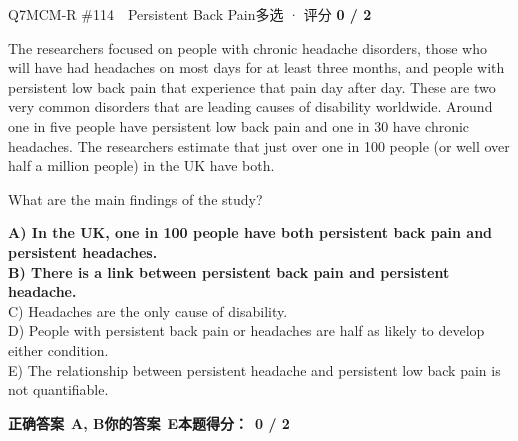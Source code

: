 \begin{qblock}{Q7\quad MCM-R \#114\ \ Persistent Back Pain}{多选 · 评分 \textcolor{cAccent}{\bfseries 0 / 2}}
\begin{promptbox}
The researchers focused on people with chronic headache disorders, those who will have had headaches on most days for at least three months, and people with persistent low back pain that experience that pain day after day. These are two very common disorders that are leading causes of disability worldwide. Around one in five people have persistent low back pain and one in 30 have chronic headaches. The researchers estimate that just over one in 100 people (or well over half a million people) in the UK have both.
\end{promptbox}
\begin{notebox}What are the main findings of the study?\end{notebox}
{\small
{\color{cFix}\textbf{A) In the UK, one in 100 people have both persistent back pain and persistent headaches.}}\\
{\color{cFix}\textbf{B) There is a link between persistent back pain and persistent headache.}}\\
C) Headaches are the only cause of disability.\\
D) People with persistent back pain or headaches are half as likely to develop either condition.\\
E) The relationship between persistent headache and persistent low back pain is not quantifiable.}
\par\smallskip
\textbf{正确答案}\ \textcolor{cFix}{\bfseries A, B}\qquad\textbf{你的答案}\ {\color{cWrong}\bfseries E}\qquad\textbf{本题得分：}\ {\color{cAccent}\bfseries 0 / 2}
\end{qblock}

